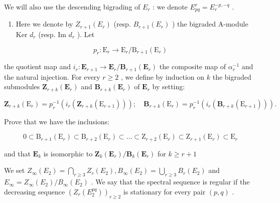 We will also use the descending bigrading of \(E_{r}\) : we denote \(E_{pq}^{r} = E_{r}^{-p, -q}\) .

\begin{enumerate}
\def\labelenumi{\alph{enumi})}
\tightlist
\item
  Here we denote by \(Z_{r+1}(E_r)\) (resp. \(B_{r+1}(E_r)\) ) the bigraded A-module Ker \(d_r\) (resp. Im \(d_r\) ). Let
\end{enumerate}

\[
p _ {r}: \mathrm{E} _ {r} \rightarrow \mathrm{E} _ {r} / \mathrm{B} _ {r + 1} (\mathrm{E} _ {r})
\]

the quotient map and \(i_{r}: \mathbf{E}_{r+1} \to \mathbf{E}_{r}/\mathbf{B}_{r+1}(\mathbf{E}_{r})\) the composite map of \(\alpha_{r}^{-1}\) and the natural injection. For every \(r \geqslant 2\) , we define by induction on \(k\) the bigraded submodules \(\mathbf{Z}_{r+k}(\mathbf{E}_{r})\) and \(\mathbf{B}_{r+k}(\mathbf{E}_{r})\) of \(\mathbf{E}_{r}\) by setting:

\[
\mathbf {Z} _ {r + k} (\mathrm{E} _ {r}) = p _ {r} ^ {- 1} \left(i _ {r} \left(\mathbf {Z} _ {r + k} (\mathrm{E} _ {r + 1})\right)\right); \quad \mathbf {B} _ {r + k} (\mathrm{E} _ {r}) = p _ {r} ^ {- 1} \left(i _ {r} \left(\mathbf {B} _ {r + k} (\mathrm{E} _ {r + 1})\right)\right).
\]

Prove that we have the inclusions:

\[
0 \subset \mathrm{B} _ {r + 1} (\mathrm{E} _ {r}) \subset \mathrm{B} _ {r + 2} (\mathrm{E} _ {r}) \subset \dots \subset \mathrm{Z} _ {r + 2} (\mathrm{E} _ {r}) \subset \mathrm{Z} _ {r + 1} (\mathrm{E} _ {r}) \subset \mathrm{E} _ {r}
\]

and that \(\mathbf{E}_k\) is isomorphic to \(\mathbf{Z}_k(\mathbf{E}_r) / \mathbf{B}_k(\mathbf{E}_r)\) for \(k\geqslant r + 1\)

We set \(Z_{\infty}(E_2) = \bigcap_{r \geqslant 3} Z_r(E_2), B_{\infty}(E_2) = \bigcup_{r \geqslant 3} B_r(E_2)\) and \(E_{\infty} = Z_{\infty}(E_2)/B_{\infty}(E_2)\) . We say that the spectral sequence is regular if the decreasing sequence \((Z_r(E_2^{pq}))_{r \geqslant 2}\) is stationary for every pair \((p, q)\) .

